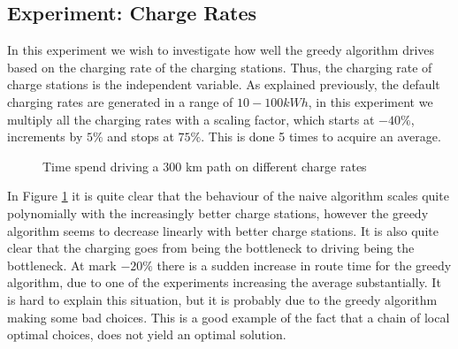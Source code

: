 \subsection{Experiment: Charge Rates}

In this experiment we wish to investigate how well the greedy algorithm drives based on the charging rate of the charging stations. Thus, the charging rate of charge stations is the independent variable. As explained previously, the default charging rates are generated in a range of $10-100 \si{kWh}$, in this experiment we multiply all the charging rates with a scaling factor, which starts at $-40\%$, increments by $5\%$ and stops at $75\%$. This is done 5 times to acquire an average. 

\begin{figure}[!htb]
\centering
{}
\caption{Time spend driving a 300 km path on different charge rates} 
\label{fig:charge_rate}
\end{figure}

In Figure \ref{fig:charge_rate} it is quite clear that the behaviour of the naive algorithm scales quite polynomially with the increasingly better charge stations, however the greedy algorithm seems to decrease linearly with better charge stations. It is also quite clear that the charging goes from being the bottleneck to driving being the bottleneck. At mark $-20\%$ there is a sudden increase in route time for the greedy algorithm, due to one of the experiments increasing the average substantially. It is hard to explain this situation, but it is probably due to the greedy algorithm making some bad choices. This is a good example of the fact that a chain of local optimal choices, does not yield an optimal solution.